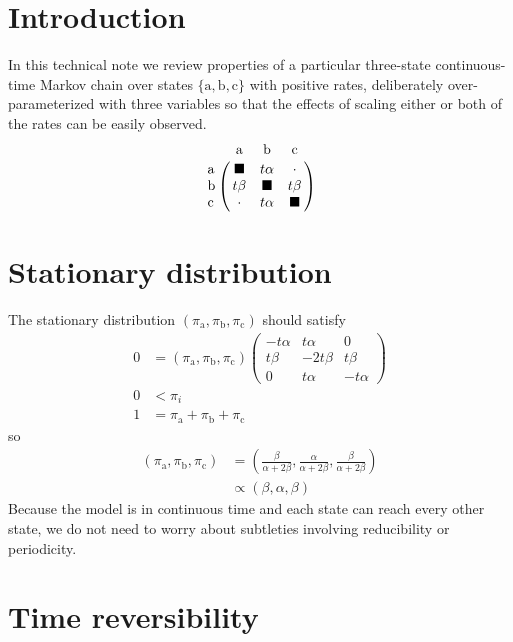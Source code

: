 \documentclass{article}
\providecommand{\Ao}{\text{a}}
\providecommand{\Bo}{\text{b}}
\providecommand{\Co}{\text{c}}
\providecommand{\Pa}{\alpha}
\providecommand{\Pb}{\beta}
\providecommand{\bs}{\blacksquare}
\begin{document}

\section{Introduction}

In this technical note we review properties of a particular three-state
continuous-time Markov chain over states $\{ \Ao, \Bo, \Co \}$
with positive rates, deliberately over-parameterized with
three variables so that the effects of scaling either or both of the rates
can be easily observed.
%
\begin{equation}
\bordermatrix{
	    & \Ao  & \Bo & \Co \cr
	\Ao & \bs  & t \Pa & \cdot \cr
	\Bo & t \Pb & \bs & t \Pb \cr
	\Co & \cdot & t \Pa & \bs  \cr
}
\end{equation}

\section{Stationary distribution}

The stationary distribution
$\left( \pi_\Ao, \pi_\Bo, \pi_\Co \right)$
should satisfy
\begin{align}
0 &=
\left( \pi_\Ao, \pi_\Bo, \pi_\Co \right)
\begin{pmatrix}
	-t \Pa & t \Pa & 0 \\
	t \Pb & - 2 t \Pb & t \Pb \\
	0 & t \Pa & -t \Pa
\end{pmatrix} \\
0 &< \pi_{i} \\
1 &= \pi_\Ao + \pi_\Bo + \pi_\Co
\end{align}
%
so
\begin{align}
\left( \pi_\Ao, \pi_\Bo, \pi_\Co \right)
&=
\left(
	\frac{\Pb}{\Pa + 2 \Pb},
	\frac{\Pa}{\Pa + 2 \Pb},
	\frac{\Pb}{\Pa + 2 \Pb}
\right) \\
&\propto
\left( \Pb, \Pa, \Pb \right)
\end{align}
%
Because the model is in continuous time
and each state can reach every other state,
we do not need to worry about subtleties involving reducibility or periodicity.

\section{Time reversibility}
\end{document}
